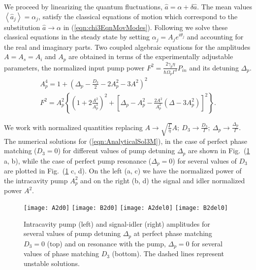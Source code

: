 \documentclass[aps,prl,twocolumn,groupedaddress]{revtex4-1}
\begin{document}
We proceed by linearizing the quantum fluctuations, $\hat{a}=\alpha+\delta\hat{a}$. The mean values $\left\langle\hat{a}_j\right\rangle=\alpha_j$, satisfy the classical equations of motion which correspond to the substitution $\hat{a}\rightarrow\alpha$ in (\ref{eqn:chi3EqnMovModes}). Following \cite{Matsko2005} we solve these classical equations in the steady state by setting $\alpha_j=A_je^{i\theta_j}$ and accounting for the real and imaginary parts. Two coupled algebraic equations for the amplitudes $A=A_s=A_i$ and $A_p$ are obtained in terms of the experimentally adjustable parameters, the normalized input pump power $F^2=\frac{2\gamma_p \eta}{\hbar \Omega_p \Gamma^3} P_{in}$ and its detuning $\Delta_p$.
\begin{gather}
A_p^4=1+\left(\Delta_p-\frac{D_3}{2}-2A_p^2-3A^2\right)^2\nonumber\\
F^2\!=\!A_p^2\left\{\!\left(\!1+2\frac{A^2}{A_p^2}\!\right)^2\!\!+\!\!\left[\Delta_p-A_p^2-\frac{2A^2}{A_p^2}\left(\Delta-3A_p^2\right)\right]^2\right\}.\label{eqn:AnalyticalSol3M}
\end{gather}

We work with normalized quantities replacing $A\rightarrow\sqrt{\frac{\Gamma}{\eta }}A;\:D_3\rightarrow\frac{D_3}{\Gamma};\:\Delta_p\rightarrow\frac{\Delta_p}{\Gamma}$. The numerical solutions for (\ref{eqn:AnalyticalSol3M}), in the case of perfect phase matching ($D_3=0$) for different values of pump detuning $\Delta_p$ are shown in Fig.~(\ref{fig:DepltionMeanChi3} a, b), while the case of perfect pump resonance ($\Delta_p=0$) for several values of $D_3$ are plotted in Fig.~(\ref{fig:DepltionMeanChi3} c, d). On the left (a, c) we have the normalized power of the intracavity pump $A_p^2$ and on the right (b, d) the signal and idler normalized power $A^2$.
\begin{figure}[htbp]
	\begin{center}
		\texttt{[image: A2d0]}
		\texttt{[image: B2d0]}
		\texttt{[image: A2del0]}
		\texttt{[image: B2del0]}
		\caption{Intracavity pump (left) and signal-idler (right) amplitudes for several values of pump detuning $\Delta_p$ at perfect phase matching $D_3=0$ (top) and on resonance with the pump, $\Delta_p=0$ for several values of phase matching $D_3$ (bottom). The dashed lines represent unstable solutions.}
		\label{fig:DepltionMeanChi3}
	\end{center}
\end{figure} 
\end{document}
